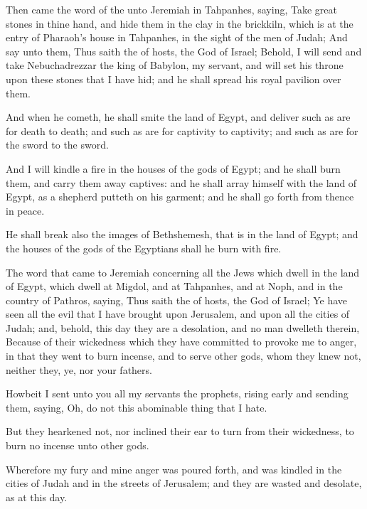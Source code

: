 \Verse Then came the word of the \LORD unto Jeremiah in Tahpanhes, saying, \Verse Take great stones in thine hand, and hide them in the clay in the brickkiln, which is at the entry of Pharaoh's house in Tahpanhes, in the sight of the men of Judah; \Verse And say unto them, Thus saith the \LORD of hosts, the God of Israel; Behold, I will send and take Nebuchadrezzar the king of Babylon, my servant, and will set his throne upon these stones that I have hid; and he shall spread his royal pavilion over them.

\Verse And when he cometh, he shall smite the land of Egypt, and deliver such as are for death to death; and such as are for captivity to captivity; and such as are for the sword to the sword.

\Verse And I will kindle a fire in the houses of the gods of Egypt; and he shall burn them, and carry them away captives: and he shall array himself with the land of Egypt, as a shepherd putteth on his garment; and he shall go forth from thence in peace.

\Verse He shall break also the images of Bethshemesh, that is in the land of Egypt; and the houses of the gods of the Egyptians shall he burn with fire.


\Chapter
\Verse The word that came to Jeremiah concerning all the Jews which dwell in the land of Egypt, which dwell at Migdol, and at Tahpanhes, and at Noph, and in the country of Pathros, saying, \Verse Thus saith the \LORD of hosts, the God of Israel; Ye have seen all the evil that I have brought upon Jerusalem, and upon all the cities of Judah; and, behold, this day they are a desolation, and no man dwelleth therein, \Verse Because of their wickedness which they have committed to provoke me to anger, in that they went to burn incense, and to serve other gods, whom they knew not, neither they, ye, nor your fathers.

\Verse Howbeit I sent unto you all my servants the prophets, rising early and sending them, saying, Oh, do not this abominable thing that I hate.

\Verse But they hearkened not, nor inclined their ear to turn from their wickedness, to burn no incense unto other gods.

\Verse Wherefore my fury and mine anger was poured forth, and was kindled in the cities of Judah and in the streets of Jerusalem; and they are wasted and desolate, as at this day.

